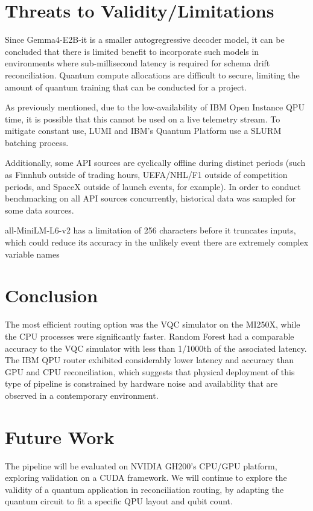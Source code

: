 \documentclass[journal]{IEEEtran}
\begin{document}
\section{Threats to Validity/Limitations}
Since Gemma4-E2B-it is a smaller autogregressive decoder model, it can be concluded that there is limited benefit to incorporate such models in environments where sub-millisecond latency is required for schema drift reconciliation. Quantum compute allocations are difficult to secure, limiting the amount of quantum training that can be conducted for a project. 

As previously mentioned, due to the low-availability of IBM Open Instance QPU time, it is possible that this cannot be used on a live telemetry stream. To mitigate constant use, LUMI and IBM's Quantum Platform use a SLURM batching process.

Additionally, some API sources are cyclically offline during distinct periods (such as Finnhub outside of trading hours, UEFA/NHL/F1 outside of competition periods, and SpaceX outside of launch events, for example). In order to conduct benchmarking on all API sources concurrently, historical data was sampled for some data sources.

all-MiniLM-L6-v2 has a limitation of 256 characters before it truncates inputs, which could reduce its accuracy in the unlikely event there are extremely complex variable names ~\cite{bert}
\section{Conclusion}
The most efficient routing option was the VQC simulator on the MI250X, while the CPU processes were significantly faster. Random Forest had a comparable accuracy to the VQC simulator with less than 1/1000th of the associated latency. The IBM QPU router exhibited considerably lower latency and accuracy than GPU and CPU reconciliation, which suggests that physical deployment of this type of pipeline is constrained by hardware noise and availability that are observed in a contemporary environment.

\section{Future Work}
The pipeline will be evaluated on NVIDIA GH200's CPU/GPU platform, exploring validation on a CUDA framework. We will continue to explore the validity of a quantum application in reconciliation routing, by adapting the quantum circuit to fit a specific QPU layout and qubit count.
\end{document}
